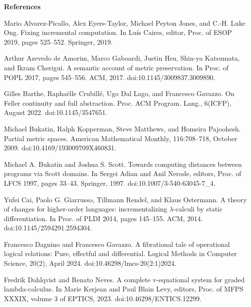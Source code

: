 
 
\par\medskip\noindent\textbf{References}\par
  
\par\noindent  [1]  Mario Alvarez-Picallo, Alex Eyers-Taylor, Michael Peyton Jones, and C.-H. Luke Ong.  Fixing incremental computation.  In Luís Caires, editor, Proc. of ESOP 2019, pages 525–552. Springer, 2019.  
 
\par\noindent  [2]  Arthur Azevedo de Amorim, Marco Gaboardi, Justin Hsu, Shin-ya Katsumata, and Ikram Cherigui.  A semantic account of metric preservation.  In Proc. of POPL 2017, pages 545–556. ACM, 2017.  doi:10.1145/3009837.3009890.  
 
\par\noindent  [3]  Gilles Barthe, Raphaëlle Crubillé, Ugo Dal Lago, and Francesco Gavazzo.  On Feller continuity and full abstraction.  Proc. ACM Program. Lang., 6(ICFP), August 2022.  doi:10.1145/3547651.  
 
\par\noindent  [4]  Michael Bukatin, Ralph Kopperman, Steve Matthews, and Homeira Pajoohesh.  Partial metric spaces.  American Mathematical Monthly, 116:708–718, October 2009.  doi:10.4169/193009709X460831.  
 
\par\noindent  [5]  Michael A. Bukatin and Joshua S. Scott.  Towards computing distances between programs via Scott domains.  In Sergei Adian and Anil Nerode, editors, Proc. of LFCS 1997, pages 33–43. Springer, 1997.  doi:10.1007/3-540-63045-7\_4.  
 
\par\noindent  [6]  Yufei Cai, Paolo G. Giarrusso, Tillmann Rendel, and Klaus Ostermann.  A theory of changes for higher-order languages: incrementalizing $\lambda$-calculi by static differentiation.  In Proc. of PLDI 2014, pages 145–155. ACM, 2014.  doi:10.1145/2594291.2594304.  
 
\par\noindent  [7]  Francesco Dagnino and Francesco Gavazzo.  A fibrational tale of operational logical relations: Pure, effectful and differential.  Logical Methods in Computer Science, 20(2), April 2024.  doi:10.46298/lmcs-20(2:1)2024.  
 
\par\noindent  [8]  Fredrik Dahlqvist and Renato Neves.  A complete v-equational system for graded lambda-calculus.  In Marie Kerjean and Paul Blain Levy, editors, Proc. of MFPS XXXIX, volume 3 of EPTICS, 2023.  doi:10.46298/ENTICS.12299.  
 
